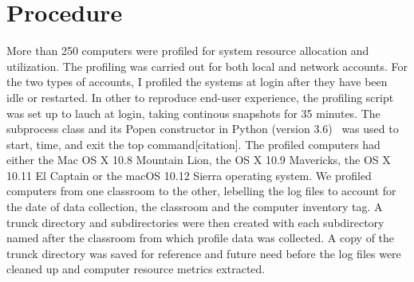 \section{Procedure}
\label{procedure}
More than 250 computers were profiled for system resource allocation 
and utilization. The profiling was carried out for both local and network 
accounts. For the two types of accounts, I profiled the systems at login 
after they have been idle or restarted. In other to reproduce end-user 
experience, the profiling script was set up to lauch at login, taking 
continous snapshots for 35 minutes.  The subprocess class and its Popen 
constructor in Python (version 3.6)~\cite{python366} was used to start, time, 
and exit the top command[citation]. The profiled computers had either the 
Mac OS X 10.8 Mountain Lion, the OS X 10.9 Mavericks, the OS X 10.11 El 
Captain or the macOS 10.12 Sierra operating system. We profiled computers 
from one classroom to the other, lebelling the log files to account for 
the date of data collection, the classroom and the computer inventory tag. 
A trunck directory and subdirectories were then created with each subdirectory 
named after the classroom from which profile data was collected. A copy of the 
trunck directory was saved for reference and future need before the log files 
were cleaned up and computer resource metrics extracted.

